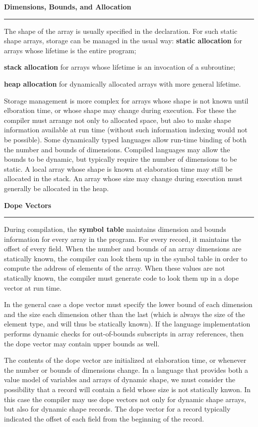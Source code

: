 \nopagenumbers
{\bf Dimensions, Bounds, and Allocation}
\vskip 1mm
\hrule

\vskip 6pt
The shape of the array is usually specified in the declaration. For such static shape arrays, storage can be managed in the usual way:
\vskip 1mm
{\bf static allocation} for arrays whose lifetime is the entire program;

\vskip 1mm
{\bf stack allocation} for arrays whose lifetime is an invocation of a subroutine;

\vskip 1mm
{\bf heap allocation} for dynamically allocated arrays with more general lifetime.

\vskip 6pt
Storage management is more complex for arrays whose shape is not known until elboration time, or whose shape may change during execution. For these the compiler must arrange not only to allocated space, but also to make shape information available at run time (without such information indexing would not be possible). Some dynamically typed languages allow run-time binding of both the number and bounds of dimensions. Compiled languages may allow the bounds to be dynamic, but typically require the number of dimensions to be static. A local array whose shape is known at elaboration time may still be allocated in the stack. An array whose size may change during execution must generally be allocated in the heap.

\vskip 12pt

{\bf Dope Vectors}
\vskip 1mm
\hrule

\vskip 6pt
During compilation, the {\bf symbol table} maintains dimension and bounds information for every array in the program. For every record, it maintains the offset of every field. When the number and bounds of an array dimensions are statically known, the compiler can look them up in the symbol table in order to compute the address of elements of the array. When these values are not statically known, the compiler must generate code to look them up in a dope vector at run time.

\vskip 6pt
In the general case a dope vector must specify the lower bound of each dimension and the size each dimension other than the last (which is always the size of the element type, and will thus be statically known). If the language implementation performs dynamic checks for out-of-bounds subscripts in array references, then the dope vector may contain upper bounds as well.

\vskip 6pt
The contents of the dope vector are initialized at elaboration time, or whenever the number or bounds of dimensions change. In a language that provides both a value model of variables and arrays of dynamic shape, we must consider the possibility that a record will contain a field whose size is not statically knwon. In this case the compiler may use dope vectors not only for dynamic shape arrays, but also for dynamic shape records. The dope vector for a record typically indicated the offset of each field from the beginning of the record.

